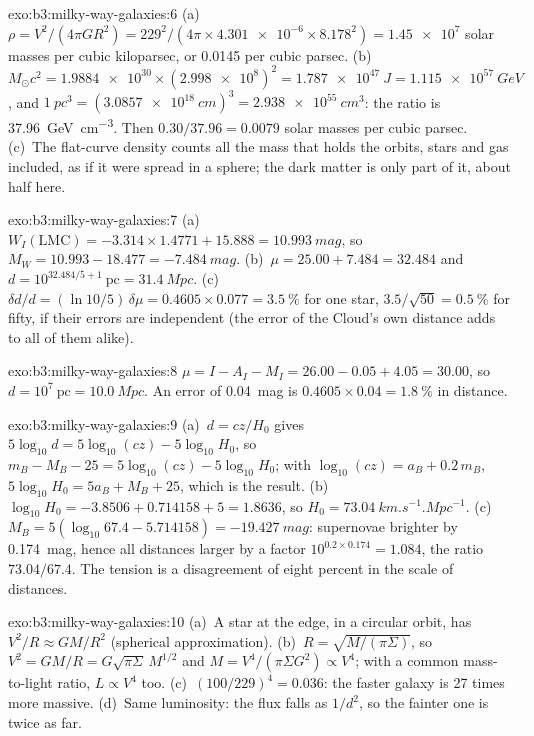 \begin{solution}{exo:b3:milky-way-galaxies:6}
(a)~$\rho = V^2/(4\pi GR^2) = 229^2/(4\pi\times\num{4.301e-6}\times
8.178^2) = \num{1.45e7}$ solar masses per cubic kiloparsec, or
\num{0.0145} per cubic parsec. (b)~$M_\odot c^2 = \num{1.9884e30}\times
(\num{2.998e8})^2 = \qty{1.787e47}{J} = \qty{1.115e57}{GeV}$, and
$\qty{1}{pc^3} = (\qty{3.0857e18}{cm})^3 = \qty{2.938e55}{cm^3}$: the
ratio is \qty{37.96}{GeV.cm^{-3}}. Then $0.30/37.96 = \num{0.0079}$ solar
masses per cubic parsec. (c)~The flat-curve density counts all the mass
that holds the orbits, stars and gas included, as if it were spread in a
sphere; the dark matter is only part of it, about half here.
\end{solution}

\begin{solution}{exo:b3:milky-way-galaxies:7}
(a)~$W_I(\mathrm{LMC}) = -3.314\times1.4771 + 15.888 = \qty{10.993}{mag}$,
so $M_W = 10.993 - 18.477 = \qty{-7.484}{mag}$. (b)~$\mu = 25.00 + 7.484 =
32.484$ and $d = 10^{32.484/5 + 1}~\mathrm{pc} = \qty{31.4}{Mpc}$.
(c)~$\delta d/d = (\ln 10/5)\,\delta\mu = 0.4605\times0.077 =
\qty{3.5}{\percent}$ for one star, $3.5/\sqrt{50} = \qty{0.5}{\percent}$
for fifty, if their errors are independent (the error of the Cloud's own
distance adds to all of them alike).
\end{solution}

\begin{solution}{exo:b3:milky-way-galaxies:8}
$\mu = I - A_I - M_I = 26.00 - 0.05 + 4.05 = 30.00$, so $d =
10^{7}~\mathrm{pc} = \qty{10.0}{Mpc}$. An error of \qty{0.04}{mag} is
$0.4605\times0.04 = \qty{1.8}{\percent}$ in distance.
\end{solution}

\begin{solution}{exo:b3:milky-way-galaxies:9}
(a)~$d = cz/H_0$ gives $5\log_{10}d = 5\log_{10}(cz) - 5\log_{10}H_0$,
so $m_B - M_B - 25 = 5\log_{10}(cz) - 5\log_{10}H_0$; with
$\log_{10}(cz) = a_B + 0.2\,m_B$, $5\log_{10}H_0 = 5a_B + M_B + 25$, which
is the result. (b)~$\log_{10}H_0 = -3.8506 + 0.714158 + 5 = 1.8636$, so
$H_0 = \qty{73.04}{km.s^{-1}.Mpc^{-1}}$. (c)~$M_B = 5(\log_{10}67.4 -
5.714158) = \qty{-19.427}{mag}$: supernovae brighter by \qty{0.174}{mag},
hence all distances larger by a factor $10^{0.2\times0.174} = 1.084$, the
ratio $73.04/67.4$. The tension is a disagreement of eight percent in the
scale of distances.
\end{solution}

\begin{solution}{exo:b3:milky-way-galaxies:10}
(a)~A star at the edge, in a circular orbit, has $V^2/R \approx GM/R^2$
(spherical approximation). (b)~$R = \sqrt{M/(\pi\Sigma)}$, so $V^2 =
GM/R = G\sqrt{\pi\Sigma}\,M^{1/2}$ and $M = V^4/(\pi\Sigma G^2) \propto
V^4$; with a common mass-to-light ratio, $L \propto V^4$ too.
(c)~$(100/229)^4 = \num{0.036}$: the faster galaxy is 27 times more
massive. (d)~Same luminosity: the flux falls as $1/d^2$, so the fainter
one is twice as far.
\end{solution}

